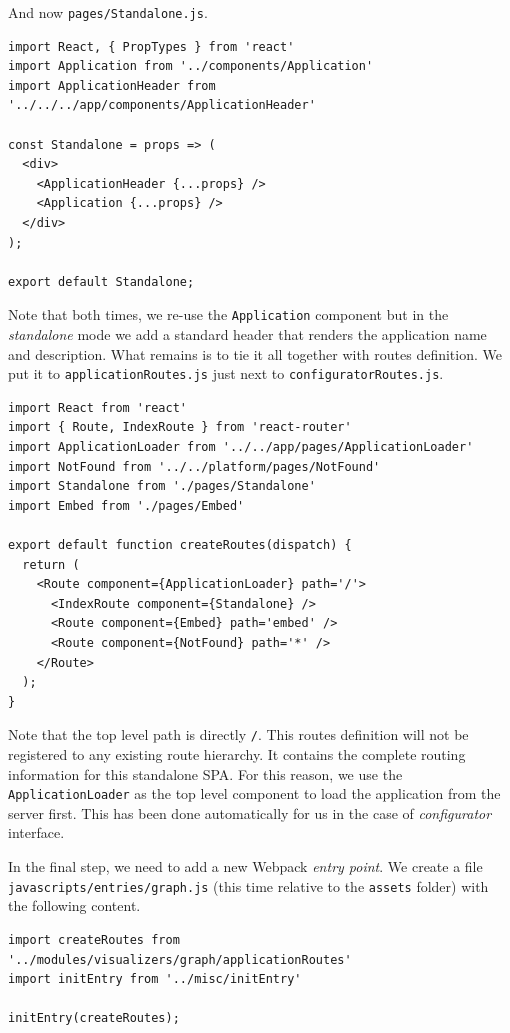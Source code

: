 And now \texttt{pages/Standalone.js}.

\begin{verbatim}
import React, { PropTypes } from 'react'
import Application from '../components/Application'
import ApplicationHeader from '../../../app/components/ApplicationHeader'

const Standalone = props => (
  <div>
    <ApplicationHeader {...props} />
    <Application {...props} />
  </div>
);

export default Standalone;
\end{verbatim}

Note that both times, we re-use the \texttt{Application} component but in the \emph{standalone} mode we add a standard header that renders the application name and description. What remains is to tie it all together with routes definition. We put it to \texttt{applicationRoutes.js} just next to \texttt{configuratorRoutes.js}.

\begin{verbatim}
import React from 'react'
import { Route, IndexRoute } from 'react-router'
import ApplicationLoader from '../../app/pages/ApplicationLoader'
import NotFound from '../../platform/pages/NotFound'
import Standalone from './pages/Standalone'
import Embed from './pages/Embed'

export default function createRoutes(dispatch) {
  return (
    <Route component={ApplicationLoader} path='/'>
      <IndexRoute component={Standalone} />
      <Route component={Embed} path='embed' />
      <Route component={NotFound} path='*' />
    </Route>
  );
}
\end{verbatim}

Note that the top level path is directly \texttt{/}. This routes definition will not be registered to any existing route hierarchy. It contains the complete routing information for this standalone SPA. For this reason, we use the \texttt{ApplicationLoader} as the top level component to load the application from the server first. This has been done automatically for us in the case of \emph{configurator} interface.
 
In the final step, we need to add a new Webpack \emph{entry point}. We create a file \texttt{javascripts/entries/graph.js} (this time relative to the \texttt{assets} folder) with the following content. 

\begin{verbatim}
import createRoutes from '../modules/visualizers/graph/applicationRoutes'
import initEntry from '../misc/initEntry'

initEntry(createRoutes);
\end{verbatim}

